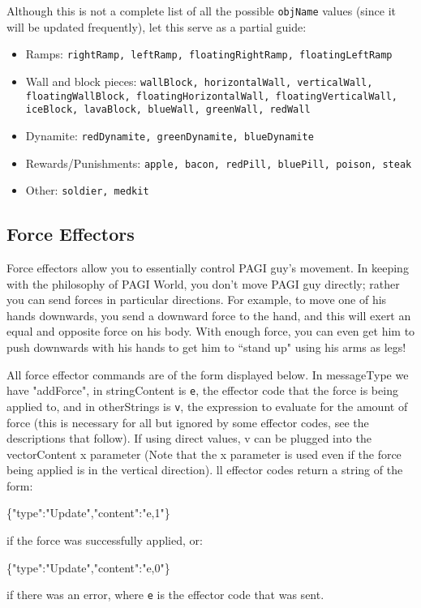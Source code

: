 Although this is not a complete list of all the possible \texttt{objName} values (since it will be updated frequently), let this serve as a partial guide:

\begin{itemize}
\item Ramps: \texttt{rightRamp, leftRamp, floatingRightRamp, floatingLeftRamp}
\item Wall and block pieces: \texttt{wallBlock, horizontalWall, verticalWall, floatingWallBlock, floatingHorizontalWall, floatingVerticalWall, iceBlock, lavaBlock, blueWall, greenWall, redWall}
\item Dynamite: \texttt{redDynamite, greenDynamite, blueDynamite}
\item Rewards/Punishments: \texttt{apple, bacon, redPill, bluePill, poison, steak}
\item Other: \texttt{soldier, medkit}
\end{itemize}


\subsection{Force Effectors}

Force effectors allow you to essentially control PAGI guy's movement. In keeping with the philosophy of PAGI World, you don't move PAGI guy directly; rather you can send forces in particular directions. For example, to move one of his hands downwards, you send a downward force to the hand, and this will exert an equal and opposite force on his body. With enough force, you can even get him to push downwards with his hands to get him to ``stand up" using his arms as legs!

All force effector commands are of the form displayed below. In messageType we have "addForce", in stringContent is \texttt{e}, the effector code that the force is being applied to, and in otherStrings is \texttt{v}, the expression to evaluate for the amount of force (this is necessary for all but ignored by some effector codes, see the descriptions that follow). If using direct values, v can be plugged into the vectorContent x parameter (Note that the x parameter is used even if the force being applied is in the vertical direction). ll effector codes return a string of the form: \begin{center}\scriptsize{\{"type":"Update","content":"e,1"\}}\end{center} 
if the force was successfully applied, or:
\begin{center}\scriptsize{\{"type":"Update","content":"e,0"\}}\end{center}
  if there was an error, where \texttt{e} is the effector code that was sent.

